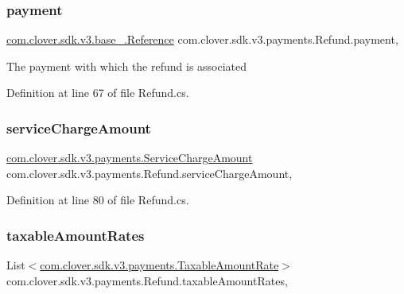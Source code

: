 \subsubsection{\texorpdfstring{payment}{payment}}
{\footnotesize\ttfamily \hyperlink{classcom_1_1clover_1_1sdk_1_1v3_1_1base___1_1_reference}{com.\+clover.\+sdk.\+v3.\+base\+\_\+.\+Reference} com.\+clover.\+sdk.\+v3.\+payments.\+Refund.\+payment\hspace{0.3cm}{\ttfamily [get]}, {\ttfamily [set]}}



The payment with which the refund is associated 



Definition at line 67 of file Refund.\+cs.

\mbox{\label{classcom_1_1clover_1_1sdk_1_1v3_1_1payments_1_1_refund_a831aebe9b83f68263540f362f7bcda7e}} 
\subsubsection{\texorpdfstring{service\+Charge\+Amount}{serviceChargeAmount}}
{\footnotesize\ttfamily \hyperlink{classcom_1_1clover_1_1sdk_1_1v3_1_1payments_1_1_service_charge_amount}{com.\+clover.\+sdk.\+v3.\+payments.\+Service\+Charge\+Amount} com.\+clover.\+sdk.\+v3.\+payments.\+Refund.\+service\+Charge\+Amount\hspace{0.3cm}{\ttfamily [get]}, {\ttfamily [set]}}



Definition at line 80 of file Refund.\+cs.

\mbox{\label{classcom_1_1clover_1_1sdk_1_1v3_1_1payments_1_1_refund_a87c1d19cb80289ca323cf16eadb59865}} 
\subsubsection{\texorpdfstring{taxable\+Amount\+Rates}{taxableAmountRates}}
{\footnotesize\ttfamily List$<$\hyperlink{classcom_1_1clover_1_1sdk_1_1v3_1_1payments_1_1_taxable_amount_rate}{com.\+clover.\+sdk.\+v3.\+payments.\+Taxable\+Amount\+Rate}$>$ com.\+clover.\+sdk.\+v3.\+payments.\+Refund.\+taxable\+Amount\+Rates\hspace{0.3cm}{\ttfamily [get]}, {\ttfamily [set]}}



